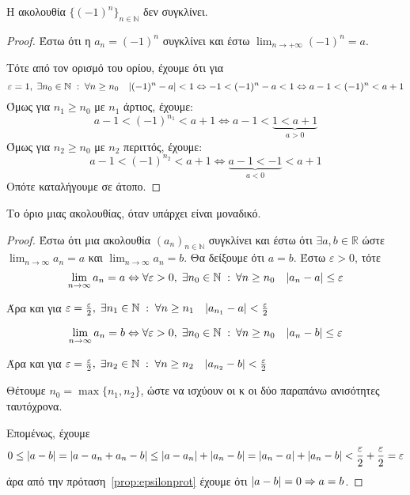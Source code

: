 \documentclass[a4paper,table]{report}
\begin{document}
\begin{mybox3}
  \begin{prop}
    Η ακολουθία $ \{ (-1)^{n} \}_{n \in \mathbb{N}} $ δεν συγκλίνει.
  \end{prop}
\end{mybox3}
\begin{proof}
\item {}
  Έστω ότι η $ a_{n}= (-1)^{n} $ συγκλίνει και έστω $ \lim_{n \to +
  \infty}(-1)^{n} = a $. 

  Τότε από τον ορισμό του ορίου, έχουμε ότι για 
  \[ 
    \varepsilon = 1, \; \exists n_{0} \in \mathbb{N} \; : \; \forall 
    n \geq n_{0} \quad \abs{(-1)^{n}-a} < 1 \Leftrightarrow -1 < 
    (-1)^{n} -a < 1 \Leftrightarrow a-1 < (-1)^{n} < a+1
  \]
  Όμως για $ n_{1} \geq n_{0} $ με $ n_{1} $ άρτιος, έχουμε:
  \[
    a-1 <  (-1)^{n_{1}} < a+1 \Leftrightarrow a-1 < 
    \underbrace{1 < a+1}_{a>0} 
  \] 
  Όμως για $ n_{2} \geq n_{0} $ με $ n_{2} $ περιττός, έχουμε:
  \[
    a-1 <  (-1)^{n_{2}} < a+1 \Leftrightarrow 
    \underbrace{a-1 < -1}_{a<0} < a+1
  \] 
  Οπότε καταλήγουμε σε άτοπο.
\end{proof}


\begin{mybox2}
  \begin{thm}
    Το όριο μιας ακολουθίας, όταν υπάρχει είναι μοναδικό.
  \end{thm}
\end{mybox2}
\begin{proof}
\item {}
  Έστω ότι μια ακολουθία $ (a_{n})_{n \in \mathbb{N}} $ συγκλίνει και έστω ότι 
  $ \exists a,b \in \mathbb{R} $ ώστε $ \lim_{n \to \infty} a_{n} = a $  και 
  $ \lim_{n \to \infty} a_{n} = b $. Θα δείξουμε ότι $ a=b $. Έστω 
  $ \varepsilon >0 $, τότε
  \[ 
    \lim_{n \to \infty} a_{n} = a \Leftrightarrow \forall 
    \varepsilon > 0, \; \exists n_{0} \in \mathbb{N} \; : \: 
    \forall n \geq n_{0} \quad \abs{a_{n}- a} \leq \varepsilon 
  \]

  Άρα και για $ \varepsilon = \frac{\varepsilon}{2}, \; \exists n_{1} \in 
  \mathbb{N} \; : \; \forall n \geq n_{1} \quad \abs{a_{n_{1}} - a} 
  < \frac{\varepsilon}{2}  $

  \[ 
    \lim_{n \to \infty} a_{n} = b \Leftrightarrow \forall 
    \varepsilon > 0, \; \exists n_{0} \in \mathbb{N} \; : \: 
    \forall n \geq n_{0} \quad \abs{a_{n}- b} \leq \varepsilon 
  \]

  Άρα και για $ \varepsilon = \frac{\varepsilon}{2}, \; \exists n_{2} \in 
  \mathbb{N} \; : \; \forall n \geq n_{2}  \quad 
  \abs{a_{n_{2}} - b} < \frac{\varepsilon}{2}  $

  Θέτουμε $ n_{0} = \max \{ n_{1}, n_{2} \} $, ώστε να ισχύουν οι 
  κ οι δύο παραπάνω ανισότητες ταυτόχρονα. 

  Επομένως, έχουμε 
  \[
    0 \leq \abs{a-b} = \abs{a- a_{n}+ a_{n}- b} \leq \abs{a- a_{n}} + \abs{a_{n}- b} =
    \abs{a_{n}-a} + \abs{a_{n}-b} < \frac{\varepsilon}{2} + \frac{\varepsilon}{2} =
    \varepsilon 
  \] 
  άρα από την πρόταση~\ref{prop:epsilonprot} έχουμε ότι 
  $ \abs{a-b} = 0 \Rightarrow a=b $.
\end{proof}
\end{document}
